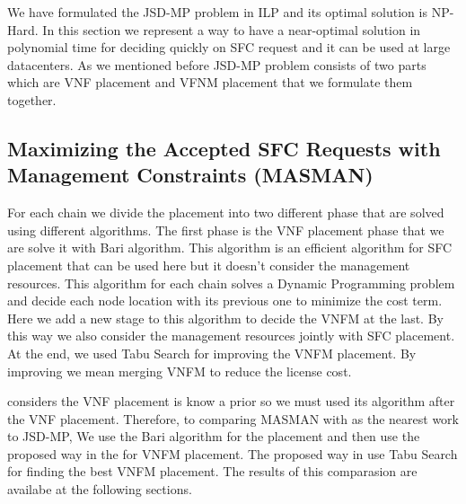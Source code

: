 We have formulated the JSD-MP problem in ILP and its optimal solution is NP-Hard.
In this section we represent a way to have a near-optimal solution in polynomial time for deciding quickly on SFC request and it can be used at large datacenters.
As we mentioned before JSD-MP problem consists of two parts which are VNF placement and VFNM placement that we formulate them together.

\subsection{Maximizing the Accepted SFC Requests with Management Constraints (MASMAN)}
For each chain we divide the placement into two different phase that are solved using different algorithms.
The first phase is the VNF placement phase that we are solve it with Bari \cite{Bari2015} algorithm.
This algorithm is an efficient algorithm for SFC placement that can be used here but it doesn't consider the management resources.
This algorithm for each chain solves a Dynamic Programming problem and decide each node location with its previous one to minimize the cost term.
Here we add a new stage to this algorithm to decide the VNFM at the last. By this way we also consider the management resources jointly with SFC placement.
At the end, we used Tabu Search for improving the VNFM placement. By improving we mean merging VNFM to reduce the license cost.


\cite{AbuLebdeh2017} considers the VNF placement is know a prior so we must used its algorithm after the VNF placement.
Therefore, to comparing MASMAN with \cite{AbuLebdeh2017} as the nearest work to JSD-MP,
We use the Bari \cite{Bari2015} algorithm for the placement and then use the proposed way in the \cite{AbuLebdeh2017} for VNFM placement.
The proposed way in \cite{AbuLebdeh2017} use Tabu Search for finding the best VNFM placement.
The results of this comparasion are availabe at the following sections.

